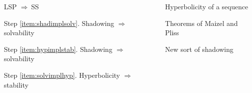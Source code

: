 \documentclass[final,notheorems]{beamer}
\newcommand{\imply}{$\Rightarrow\ $}
\newcommand{\devskipcol}{}
\theoremstyle{plain} \newtheorem{theorem}{Theorem}
\theoremstyle{plain} \newtheorem*{theoremnon}{Theorem}
\theoremstyle{definition} \newtheorem{deff}{Definition}
\theoremstyle{definition} \newtheorem*{deffnon}{Definition}
\theoremstyle{remark} \newtheorem{rem}{Remark}
\newlength{\columnheight}
\begin{document}
\begin{frame}
\begin{columns}
\begin{column}{.325\textwidth}
%
%
\parbox[t][\columnheight]{\textwidth}{
%
\devskipcol
%
\begin{block}{LSP \imply SS}
\begin{minipage}{0.97\textwidth}


\end{minipage}
\end{block}
%
\begin{block}{Step \ref{item:shadimplsolv}. Shadowing \imply solvability}
\begin{minipage}{0.97\textwidth}

\end{minipage}
\end{block}
%
\begin{block}{Step \ref{item:hypimplstab}. Shadowing \imply solvability}
\begin{minipage}{0.97\textwidth}

\end{minipage}
\end{block}
%
\begin{block}{Step \ref{item:solvimplhyp}. Hyperbolicity \imply stability}
\begin{minipage}{0.97\textwidth}

\end{minipage}
\end{block}
%
%
%
%
}
\end{column}


\begin{column}{.325\textwidth}
%
\parbox[t][\columnheight]{\textwidth}{
%
\devskipcol
%
\begin{block}{Hyperbolicity of a sequence}
\begin{minipage}{0.97\textwidth}

\end{minipage}
\end{block}
%
%
\begin{block}{Theorems of Maizel and Pliss}
\begin{minipage}{0.97\textwidth}


\end{minipage}
\end{block}
%
%
\begin{block}{New sort of shadowing}
\begin{minipage}{0.97\textwidth}

\end{minipage}
\end{block}
%
}

\end{column}

\end{columns}


\end{frame}
\end{document}
